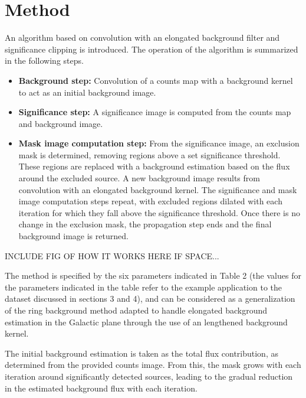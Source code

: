 \documentclass{PoS}
\begin{document}
\section{Method}

An algorithm based on convolution with an elongated background filter and significance clipping is introduced. The operation of the algorithm is summarized in the following steps.

\begin{itemize}[noitemsep,nolistsep]
\item \textbf{Background step:} Convolution of a counts map with a background kernel to act as an initial background image.
\item \textbf{Significance step:} A significance image is computed from the counts map and background image.
\item \textbf{Mask image computation step:} From the significance image, an exclusion mask is determined, removing regions above a set significance threshold. These regions are replaced with a background estimation based on the flux around the excluded source. A new background image results from convolution with an elongated background kernel. The significance and mask image computation steps repeat, with excluded regions dilated with each iteration for which they fall above the significance threshold. Once there is no change in the exclusion mask, the propagation step ends and the final background image is returned.
\end{itemize}

INCLUDE FIG OF HOW IT WORKS HERE IF SPACE...

The method is specified by the six parameters indicated in Table 2 (the values for the parameters indicated in the table refer to the example application to the dataset discussed in sections 3 and 4), and can be considered as a generalization of the ring background method \cite{berge} adapted to handle elongated background estimation in the Galactic plane through the use of an lengthened background kernel.

The initial background estimation is taken as the total flux contribution, as determined from the provided counts image. From this, the mask grows with each iteration around significantly detected sources, leading to the gradual reduction in the estimated background flux with each iteration.
\end{document}
